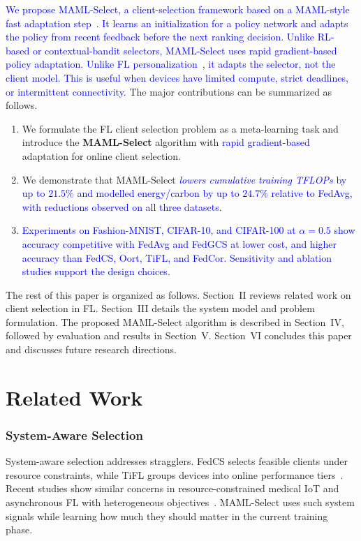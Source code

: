 \documentclass[journal]{IEEEtran}
\newcommand{\revision}[1]{\textcolor{blue}{#1}}
\begin{document}
\revision{We propose MAML-Select, a client-selection framework based on a MAML-style fast adaptation step}~\cite{finn2017model}. \revision{It learns an initialization for a policy network and adapts the policy from recent feedback before the next ranking decision. Unlike RL-based or contextual-bandit selectors, MAML-Select uses rapid gradient-based policy adaptation. Unlike FL personalization}~\cite{fallah2020personalized}, \revision{it adapts the selector, not the client model. This is useful when devices have limited compute, strict deadlines, or intermittent connectivity.} The major contributions can be summarized as follows.
\begin{enumerate}
\setlength{\itemsep}{0pt}
\setlength{\topsep}{1pt}
		\item We formulate the FL client selection problem as a meta-learning task and introduce the \textbf{MAML-Select} algorithm with \revision{rapid gradient-based} adaptation for online client selection.
		\item We demonstrate that MAML-Select \revision{\textit{lowers cumulative training TFLOPs} by up to $21.5\%$ and modelled energy/carbon by up to $24.7\%$ relative to FedAvg, with reductions observed on all three datasets}.
	\item \revision{Experiments on Fashion-MNIST, CIFAR-10, and CIFAR-100 at $\alpha = 0.5$ show accuracy competitive with FedAvg and FedGCS at lower cost, and higher accuracy than FedCS, Oort, TiFL, and FedCor. Sensitivity and ablation studies support the design choices.}
\end{enumerate}

The rest of this paper is organized as follows. Section~II reviews related work on client selection in FL. Section~III details the system model and problem formulation. The proposed MAML-Select algorithm is described in Section~IV, followed by evaluation and results in Section~V. Section~VI concludes this paper and discusses future research directions.

\section{Related Work}
\subsubsection{System-Aware Selection}
System-aware selection addresses stragglers. FedCS selects feasible clients under resource constraints, while TiFL groups devices into online performance tiers~\cite{nishio2019client,chai2020tifl}. Recent studies show similar concerns in resource-constrained medical IoT and asynchronous FL with heterogeneous objectives~\cite{tapwal2026stragglers,forootani2026asynchronous}. MAML-Select uses such system signals while learning how much they should matter in the current training phase.
\end{document}
